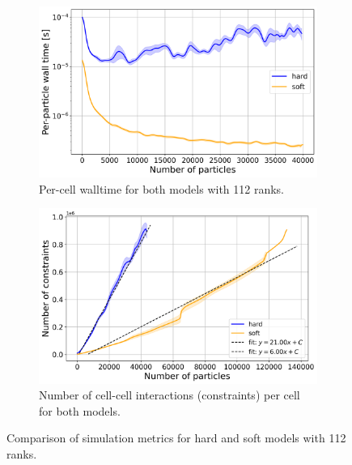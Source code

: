 \documentclass[conference]{IEEEtran}
\begin{document}
\begin{figure}[h]
    \centering
    \begin{subfigure}[b]{0.9\linewidth}
        \centering
        \includegraphics[width=\linewidth]{figures/comparison_plots/combined_num_particles_vs_wall_time_per_particle_with_fit.png}
        \caption{Per-cell walltime for both models with 112 ranks.}
        \label{fig:walltime_per_particle}
    \end{subfigure}

    \begin{subfigure}[b]{0.9\linewidth}
        \centering
        \includegraphics[width=\linewidth]{figures/comparison_plots/combined_num_constraints_vs_num_particles_with_fit.png}
        \caption{Number of cell-cell interactions (constraints) per cell for both models.}
        \label{fig:num_constraints}
    \end{subfigure}

    \caption{Comparison of simulation metrics for hard and soft models with 112 ranks.}
    \label{fig:comparison_metrics}
\end{figure}
\end{document}
